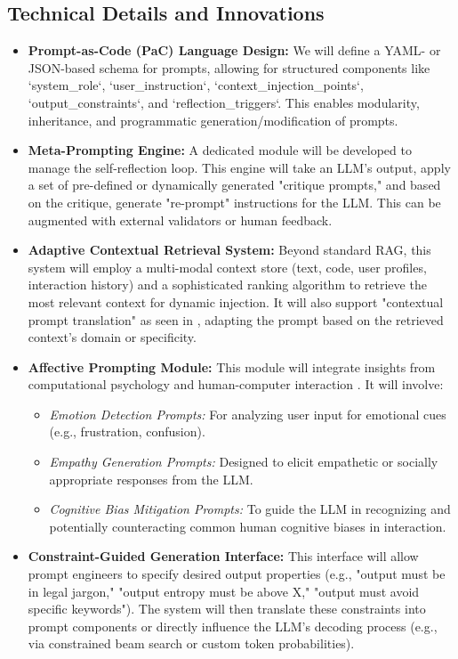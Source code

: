 \documentclass{article}
\begin{document}
\subsection{Technical Details and Innovations}
\begin{itemize}
    \item \textbf{Prompt-as-Code (PaC) Language Design:} We will define a YAML- or JSON-based schema for prompts, allowing for structured components like `system_role`, `user_instruction`, `context_injection_points`, `output_constraints`, and `reflection_triggers`. This enables modularity, inheritance, and programmatic generation/modification of prompts.
    \item \textbf{Meta-Prompting Engine:} A dedicated module will be developed to manage the self-reflection loop. This engine will take an LLM's output, apply a set of pre-defined or dynamically generated "critique prompts," and based on the critique, generate "re-prompt" instructions for the LLM. This can be augmented with external validators or human feedback.
    \item \textbf{Adaptive Contextual Retrieval System:} Beyond standard RAG, this system will employ a multi-modal context store (text, code, user profiles, interaction history) and a sophisticated ranking algorithm to retrieve the most relevant context for dynamic injection. It will also support "contextual prompt translation" as seen in \citet{paper5}, adapting the prompt based on the retrieved context's domain or specificity.
    \item \textbf{Affective Prompting Module:} This module will integrate insights from computational psychology and human-computer interaction \citep{paper2}. It will involve:
    \begin{itemize}
        \item \textit{Emotion Detection Prompts:} For analyzing user input for emotional cues (e.g., frustration, confusion).
        \item \textit{Empathy Generation Prompts:} Designed to elicit empathetic or socially appropriate responses from the LLM.
        \item \textit{Cognitive Bias Mitigation Prompts:} To guide the LLM in recognizing and potentially counteracting common human cognitive biases in interaction.
    \end{itemize}
    \item \textbf{Constraint-Guided Generation Interface:} This interface will allow prompt engineers to specify desired output properties (e.g., "output must be in legal jargon," "output entropy must be above X," "output must avoid specific keywords"). The system will then translate these constraints into prompt components or directly influence the LLM's decoding process (e.g., via constrained beam search or custom token probabilities).
\end{itemize}
\end{document}
